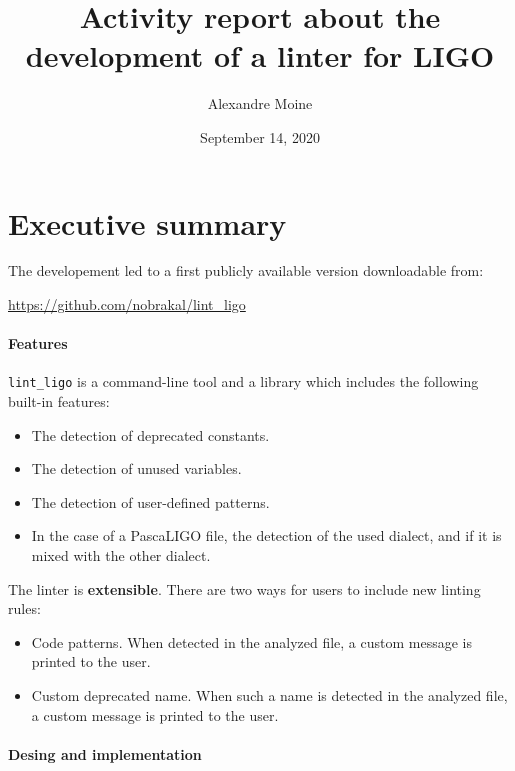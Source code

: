 \documentclass[10pt,a4paper]{article}
\author{Alexandre Moine}
\title{Activity report about the development of a linter for LIGO}
\date{September 14, 2020}
\begin{document}
\maketitle
{}

\section{Executive summary}

The developement led to a first publicly available version downloadable from:
\begin{center}
  \url{https://github.com/nobrakal/lint\_ligo}
\end{center}

\paragraph{Features}

\verb|lint_ligo| is a command-line tool and a library which includes the following built-in features:

\begin{itemize}
\item The detection of deprecated constants.
\item The detection of unused variables.
\item The detection of user-defined patterns.
\item In the case of a PascaLIGO file, the detection of the used dialect, and if it is mixed with the other dialect.
\end{itemize}

The linter is \textbf{extensible}. There are two ways for users to include new linting rules:

\begin{itemize}
\item Code patterns. When detected in the analyzed file, a custom message is printed to the user.
\item Custom deprecated name. When such a name is detected in the analyzed file, a custom message is printed to the user.
\end{itemize}

\paragraph{Desing and implementation}
\end{document}
